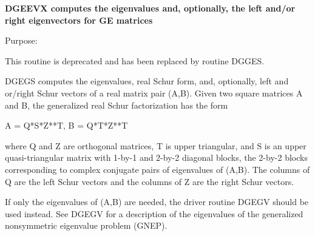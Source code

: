 {\bfseries  D\+G\+E\+E\+V\+X computes the eigenvalues and, optionally, the left and/or right eigenvectors for G\+E matrices} 

 \begin{DoxyParagraph}{Purpose\+: }
\begin{DoxyVerb} This routine is deprecated and has been replaced by routine DGGES.

 DGEGS computes the eigenvalues, real Schur form, and, optionally,
 left and or/right Schur vectors of a real matrix pair (A,B).
 Given two square matrices A and B, the generalized real Schur
 factorization has the form

   A = Q*S*Z**T,  B = Q*T*Z**T

 where Q and Z are orthogonal matrices, T is upper triangular, and S
 is an upper quasi-triangular matrix with 1-by-1 and 2-by-2 diagonal
 blocks, the 2-by-2 blocks corresponding to complex conjugate pairs
 of eigenvalues of (A,B).  The columns of Q are the left Schur vectors
 and the columns of Z are the right Schur vectors.

 If only the eigenvalues of (A,B) are needed, the driver routine
 DGEGV should be used instead.  See DGEGV for a description of the
 eigenvalues of the generalized nonsymmetric eigenvalue problem
 (GNEP).\end{DoxyVerb}
 
\end{DoxyParagraph}


